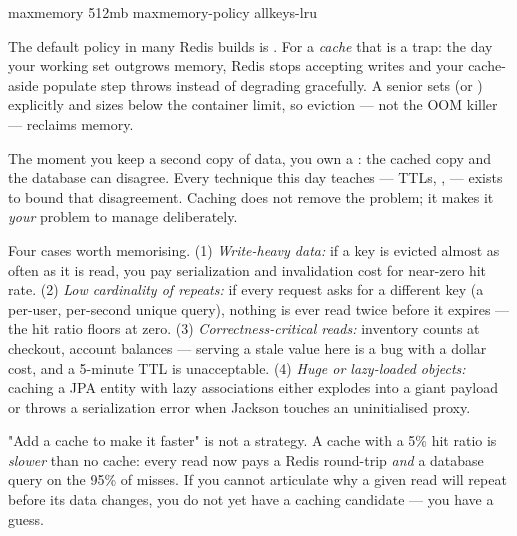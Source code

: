 \begin{propsbox}
maxmemory 512mb
maxmemory-policy allkeys-lru
\end{propsbox}

\begin{seniornote}
The default policy in many Redis builds is . For a \emph{cache} that is a trap: the day your working set outgrows memory, Redis stops accepting writes and your cache-aside populate step throws instead of degrading gracefully. A senior sets  (or ) explicitly and sizes  below the container limit, so eviction --- not the OOM killer --- reclaims memory.
\end{seniornote}


 The moment you keep a second copy of data, you own a : the cached copy and the database can disagree. Every technique this day teaches --- TTLs, ,  --- exists to bound that disagreement. Caching does not remove the problem; it makes it \emph{your} problem to manage deliberately.

 Four cases worth memorising. (1) \emph{Write-heavy data:} if a key is evicted almost as often as it is read, you pay serialization and invalidation cost for near-zero hit rate. (2) \emph{Low cardinality of repeats:} if every request asks for a different key (a per-user, per-second unique query), nothing is ever read twice before it expires --- the hit ratio floors at zero. (3) \emph{Correctness-critical reads:} inventory counts at checkout, account balances --- serving a stale value here is a bug with a dollar cost, and a 5-minute TTL is unacceptable. (4) \emph{Huge or lazy-loaded objects:} caching a JPA entity with lazy associations either explodes into a giant payload or throws a serialization error when Jackson touches an uninitialised proxy.

\begin{misconception}
"Add a cache to make it faster" is not a strategy. A cache with a 5\% hit ratio is \emph{slower} than no cache: every read now pays a Redis round-trip \emph{and} a database query on the 95\% of misses. If you cannot articulate why a given read will repeat before its data changes, you do not yet have a caching candidate --- you have a guess.
\end{misconception}


